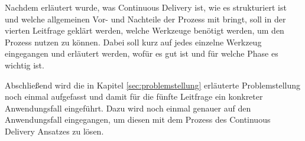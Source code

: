 Nachdem erläutert wurde, was Continuous Delivery ist, wie es strukturiert ist und welche allgemeinen Vor- und Nachteile der Prozess mit bringt, soll in der vierten Leitfrage geklärt werden, welche Werkzeuge benötigt werden, um den Prozess nutzen zu können. Dabei soll kurz auf jedes einzelne Werkzeug eingegangen und erläutert werden, wofür es gut ist und für welche Phase es wichtig ist.

Abschließend wird die in Kapitel \ref{sec:problemstellung} erläuterte Problemstellung noch einmal aufgefasst und damit für die fünfte Leitfrage ein konkreter Anwendungsfall eingeführt. Dazu wird noch einmal genauer auf den Anwendungsfall eingegangen, um diesen mit dem Prozess des Continuous Delivery Ansatzes zu lösen.